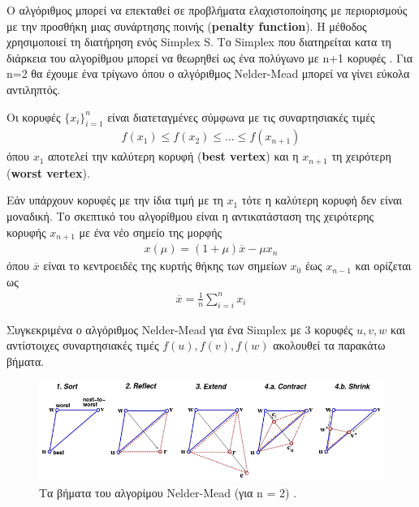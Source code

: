 \documentclass[a4paper,12pt,twoside]{report}
\theoremstyle{plain}
\theoremstyle{definition}
\theoremstyle{remark}
\begin{document}
Ο αλγόριθμος μπορεί να επεκταθεί σε προβλήματα ελαχιστοποίησης με περιορισμούς με την προσθήκη μιας συνάρτησης ποινής (\textbf{penalty function}).
Η μέθοδος χρησιμοποιεί τη διατήρηση ενός Simplex S. Το Simplex που διατηρείται κατα τη διάρκεια του αλγορίθμου μπορεί να θεωρηθεί ως ένα πολύγωνο με n+1 κορυφές . Για n=2 θα έχουμε ένα τρίγωνο όπου ο αλγόριθμος Nelder-Mead μπορεί να γίνει εύκολα αντιληπτός.

Οι κορυφές $\{x_i\}_{i=1}^n$ είναι διατεταγμένες σύμφωνα με τις συναρτησιακές τιμές
\begin{align*}
f(x_1) \leq f(x_2) \leq ... \leq f(x_{n+1}) 
\end{align*}
όπου $x_1$ αποτελεί την καλύτερη κορυφή (\textbf{best vertex}) και η $x_{n+1}$ τη χειρότερη (\textbf{worst vertex}).

Eάν υπάρχουν κορυφές με την ίδια τιμή με τη $x_1$ τότε η καλύτερη κορυφή δεν είναι μοναδική. Το σκεπτικό του αλγορίθμου είναι η αντικατάσταση της χειρότερης κορυφής $x_{n+1}$ με ένα νέο σημείο της μορφής 
\begin{align*}
x(\mu) = (1+\mu)\overline{x} - \mu x_n
\end{align*}
όπου $\overline{x}$ είναι το κεντροειδές της κυρτής θήκης των σημείων $x_0$ έως $x_{n-1}$ και ορίζεται ως 
\begin{align*}
\overline{x} = \frac{1}{n}\sum_{i=i}^{n}x_i
\end{align*}


Συγκεκριμένα ο αλγόριθμος Νelder-Mead για ένα Simplex  με 3 κορυφές $u,v,w$ και αντίστοιχες συναρτησιακές τιμές $f(u),f(v),f(w)$ ακολουθεί τα παρακάτω βήματα.

\begin{figure}[h]
\centering
\includegraphics[scale=0.64]{nelder1b}
\caption{Τα βήματα του αλγορίμου Nelder-Mead (για n = 2) \cite{gavin2013nelder}.}
\end{figure}
\end{document}
